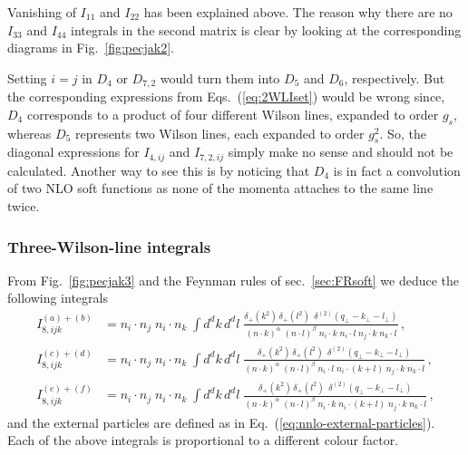 \documentclass[a4paper,11pt]{report}
\numberwithin{equation}{section}
\begin{document}
Vanishing of $I_{11}$ and $I_{22}$ has been explained above. The reason why there
are no $I_{33}$ and $I_{44}$ integrals in the second matrix is clear by looking
at the corresponding diagrams in Fig.~\ref{fig:pecjak2}. 

Setting $i=j$ in $D_4$ or $D_{7,2}$ would turn them into $D_5$ and $D_6$,
respectively. But the corresponding expressions from Eqs.~(\ref{eq:2WLIset})
would be wrong since, \eg $D_4$ corresponds to a product of four different
Wilson lines, expanded to order $g_s$, whereas $D_5$ represents two Wilson
lines, each expanded to order $g_s^2$. So, the diagonal expressions for
$I_{4, ij}$ and $I_{7,2, ij}$ simply make no sense and should not be calculated.
%
Another way to see this is by noticing that $D_4$ is in fact a convolution of
two NLO soft functions as none of the momenta attaches to the same
line twice.



\subsubsection{Three-Wilson-line integrals}


From Fig.~\ref{fig:pecjak3} and the Feynman rules of sec.~\ref{sec:FRsoft} we
deduce the following integrals~\cite{Ferroglia:2012uy} 
%
\begin{subequations}
  \label{eq:3WLIset}
  \begin{align}
    I_{8, ijk}^{(a)+(b)} &= 
    n_i \cdot n_j\; n_i \cdot n_k\; 
    \int d^d k\, d^d l\; 
    \frac{\delta_+(k^2) \, \delta_+(l^2)\,
      \; \delta^{(2)}(q_\perp-k_\perp-l_\perp)}
      {(n \cdot k)^\alpha\; (n \cdot l)^\beta \; 
      n_i \cdot k \; n_i \cdot l \; n_j \cdot k \; n_k \cdot l} \, ,
    \\[0.7em]
    I_{8, ijk}^{(c)+(d)} &= 
    n_i \cdot n_j\; n_i \cdot n_k\; 
    \int d^d k\, d^d l\; 
    \frac{\delta_+(k^2) \, \delta_+(l^2)\,
      \; \delta^{(2)}(q_\perp-k_\perp-l_\perp)}
      {(n \cdot k)^\alpha\; (n \cdot l)^\beta \; 
      n_i \cdot l \; n_i \cdot (k+l) \; n_j \cdot k \; n_k \cdot l} \, ,
    \\[0.7em]
    I_{8, ijk}^{(e)+(f)} &= 
    n_i \cdot n_j\; n_i \cdot n_k\; 
    \int d^d k\, d^d l\; 
    \frac{\delta_+(k^2) \, \delta_+(l^2)\,
      \; \delta^{(2)}(q_\perp-k_\perp-l_\perp)}
      {(n \cdot k)^\alpha\; (n \cdot l)^\beta \; 
      n_i \cdot k \; n_i \cdot (k+l) \; n_j \cdot k \; n_k \cdot l} \,,
  \end{align}
\end{subequations}
%
and the external particles are defined as in
Eq.~(\ref{eq:nnlo-external-particles}).
%
Each of the above integrals is proportional to a different colour factor.
\end{document}
